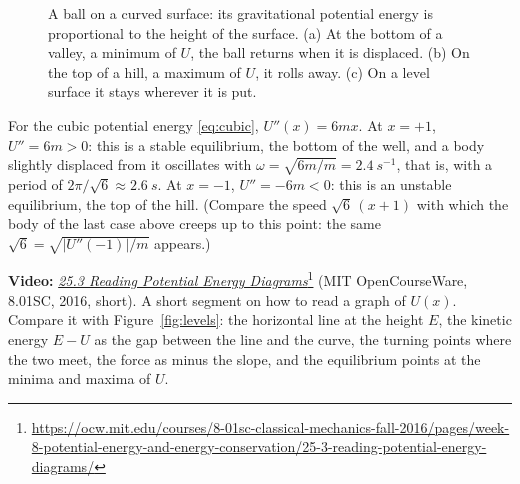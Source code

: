 \documentclass[11pt,a4paper]{article}
\begin{document}
\begin{figure}[ht]
\centering
{}
\caption{A ball on a curved surface: its gravitational potential energy is proportional to the height
of the surface. (a) At the bottom of a valley, a minimum of $U$, the ball returns when it is
displaced. (b) On the top of a hill, a maximum of $U$, it rolls away. (c) On a level surface it stays
wherever it is put.}\label{fig:equilibrium}
\end{figure}

For the cubic potential energy \eqref{eq:cubic}, $U''(x) = 6mx$. At $x = +1$, $U'' = 6m > 0$: this is
a stable equilibrium, the bottom of the well, and a body slightly displaced from it oscillates with
$\omega = \sqrt{6m/m} = \qty{2.4}{s^{-1}}$, that is, with a period of $2\pi/\sqrt6 \approx \qty{2.6}{s}$.
At $x = -1$, $U'' = -6m < 0$: this is an unstable equilibrium, the top of the hill. (Compare the
speed $\sqrt6\,(x + 1)$ with which the body of the last case above creeps up to this point: the same
$\sqrt6 = \sqrt{|U''(-1)|/m}$ appears.)

\begin{aside}
\textbf{Video:}
\href{https://ocw.mit.edu/courses/8-01sc-classical-mechanics-fall-2016/pages/week-8-potential-energy-and-energy-conservation/25-3-reading-potential-energy-diagrams/}{\emph{25.3
Reading Potential Energy
Diagrams}}\footnote{\raggedright\url{https://ocw.mit.edu/courses/8-01sc-classical-mechanics-fall-2016/pages/week-8-potential-energy-and-energy-conservation/25-3-reading-potential-energy-diagrams/}}
(MIT OpenCourseWare, 8.01SC, 2016, short). A short segment on how to read a graph of $U(x)$.
Compare it with Figure~\ref{fig:levels}: the horizontal line at the height $E$, the kinetic energy
$E - U$ as the gap between the line and the curve, the turning points where the two meet, the force
as minus the slope, and the equilibrium points at the minima and maxima of $U$.
\end{aside}
\end{document}

